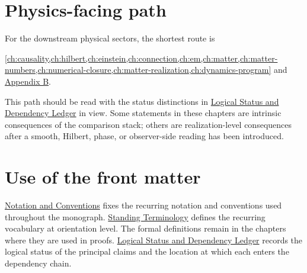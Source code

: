\section*{Physics-facing path}
For the downstream physical sectors, the shortest route is
\begin{center}
\cref{ch:causality,ch:hilbert,ch:einstein,ch:connection,ch:em,ch:matter,ch:matter-numbers,ch:numerical-closure,ch:matter-realization,ch:dynamics-program}
and \hyperref[app:fusion]{Appendix B}.
\end{center}
This path should be read with the status distinctions in
\hyperref[ch:logical-status]{Logical Status and Dependency Ledger} in
view.  Some statements in these chapters are
intrinsic consequences of the comparison stack; others are
realization-level consequences after a smooth, Hilbert, phase, or
observer-side reading has been introduced.

\section*{Use of the front matter}
\hyperref[ch:notation-conventions]{Notation and Conventions} fixes the
recurring notation and conventions used throughout the monograph.
\hyperref[ch:standing-terminology]{Standing Terminology}
defines the recurring vocabulary at orientation level.  The formal
definitions remain in the chapters where they are used in proofs.
\hyperref[ch:logical-status]{Logical Status and Dependency Ledger}
records the logical status of the principal claims and the location at
which each enters the dependency chain.
